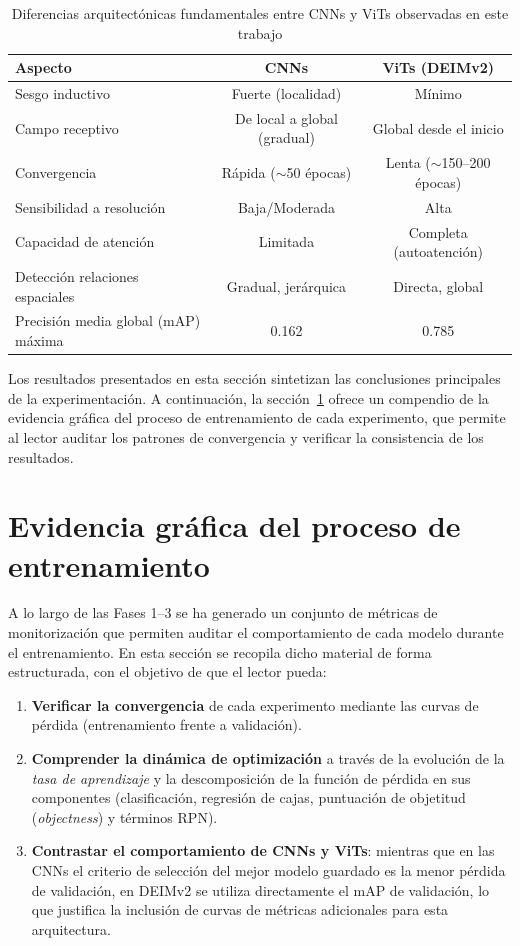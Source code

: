 \begin{table}[htbp]
\centering
\begin{tabular}{lcc}
\toprule
\textbf{Aspecto} & \textbf{CNNs} & \textbf{ViTs (DEIMv2)} \\
\midrule
Sesgo inductivo & Fuerte (localidad) & Mínimo \\
Campo receptivo & De local a global (gradual) & Global desde el inicio \\
Convergencia & Rápida ($\sim$50 épocas) & Lenta ($\sim$150--200 épocas) \\
Sensibilidad a resolución & Baja/Moderada & Alta \\
Capacidad de atención & Limitada & Completa (autoatención) \\
Detección relaciones espaciales & Gradual, jerárquica & Directa, global \\
Precisión media global (mAP) máxima & 0.162 & 0.785 \\
\bottomrule
\end{tabular}
\caption{Diferencias arquitectónicas fundamentales entre CNNs y ViTs observadas en este trabajo}
\label{tab:diferencias_arquitectonicas}
\end{table}

Los resultados presentados en esta sección sintetizan las conclusiones principales de la experimentación. A continuación, la sección~\ref{sec:evidencia_grafica} ofrece un compendio de la evidencia gráfica del proceso de entrenamiento de cada experimento, que permite al lector auditar los patrones de convergencia y verificar la consistencia de los resultados.

\FloatBarrier
\clearpage
\section{Evidencia gráfica del proceso de entrenamiento}
\label{sec:evidencia_grafica}

A lo largo de las Fases 1--3 se ha generado un conjunto de métricas de monitorización que permiten auditar el comportamiento de cada modelo durante el entrenamiento. En esta sección se recopila dicho material de forma estructurada, con el objetivo de que el lector pueda:

\begin{enumerate}
    \item \textbf{Verificar la convergencia} de cada experimento mediante las curvas de pérdida (entrenamiento frente a validación).
    \item \textbf{Comprender la dinámica de optimización} a través de la evolución de la \textit{tasa de aprendizaje} y la descomposición de la función de pérdida en sus componentes (clasificación, regresión de cajas, puntuación de objetitud (\textit{objectness}) y términos RPN).
    \item \textbf{Contrastar el comportamiento de CNNs y ViTs}: mientras que en las CNNs el criterio de selección del mejor modelo guardado es la menor pérdida de validación, en DEIMv2 se utiliza directamente el mAP de validación, lo que justifica la inclusión de curvas de métricas adicionales para esta arquitectura.
\end{enumerate}

